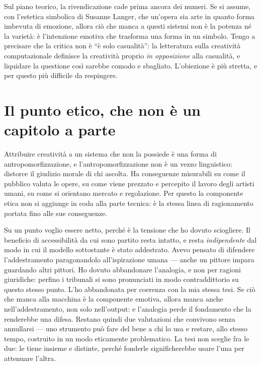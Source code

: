 \documentclass[10pt,a4paper]{article}
\begin{document}
Sul piano teorico, la rivendicazione cade prima ancora dei numeri.
Se si assume, con l'estetica simbolica di Susanne Langer, che un'opera sia arte in quanto forma imbevuta di emozione, allora ciò che manca a questi sistemi non è la potenza né la varietà: è l'intenzione emotiva che trasforma una forma in un simbolo.
Tengo a precisare che la critica non è \enquote{è solo casualità}: la letteratura sulla creatività computazionale definisce la creatività proprio \emph{in opposizione} alla casualità, e liquidare la questione così sarebbe comodo e sbagliato.
L'obiezione è più stretta, e per questo più difficile da respingere.

\section{Il punto etico, che non è un capitolo a parte}

Attribuire creatività a un sistema che non la possiede è una forma di antropomorfizzazione, e l'antropomorfizzazione non è un vezzo linguistico: distorce il giudizio morale di chi ascolta.
Ha conseguenze misurabili su come il pubblico valuta le opere, su come viene prezzato e percepito il lavoro degli artisti umani, su come si orientano mercato e regolazione.
Per questo la componente etica non si aggiunge in coda alla parte tecnica: è la stessa linea di ragionamento portata fino alle sue conseguenze.

Su un punto voglio essere netto, perché è la tensione che ho dovuto sciogliere.
Il beneficio di accessibilità da cui sono partito resta intatto, e resta \emph{indipendente} dal modo in cui il modello sottostante è stato addestrato.
Avevo pensato di difendere l'addestramento paragonandolo all'ispirazione umana --- anche un pittore impara guardando altri pittori.
Ho dovuto abbandonare l'analogia, e non per ragioni giuridiche: perfino i tribunali si sono pronunciati in modo contraddittorio su questo stesso punto.
L'ho abbandonata per coerenza con la mia stessa tesi.
Se ciò che manca alla macchina è la componente emotiva, allora manca anche nell'addestramento, non solo nell'output: e l'analogia perde il fondamento che la renderebbe una difesa.
Restano quindi due valutazioni che convivono senza annullarsi --- uno strumento può fare del bene a chi lo usa e restare, allo stesso tempo, costruito in un modo eticamente problematico.
La tesi non sceglie fra le due: le tiene insieme e distinte, perché fonderle significherebbe usare l'una per attenuare l'altra.
\end{document}
